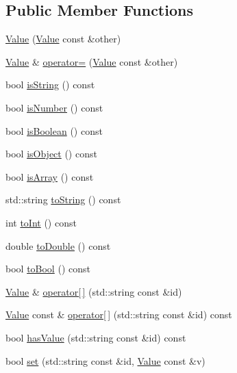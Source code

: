 \subsection*{Public Member Functions}
\begin{DoxyCompactItemize}
\item 
\hyperlink{classj_1_1_value_a9281dfcb57d331813484c0fb2926954e}{Value} (\hyperlink{classj_1_1_value}{Value} const \&other)
\item 
\hyperlink{classj_1_1_value}{Value} \& \hyperlink{classj_1_1_value_ac6f7f01183a7309a5290397f4b981a74}{operator=} (\hyperlink{classj_1_1_value}{Value} const \&other)
\item 
bool \hyperlink{classj_1_1_value_a6afbb65a1bad5ab74846b8ddc4facb1e}{is\-String} () const 
\item 
bool \hyperlink{classj_1_1_value_affbf70f3c3c1b9248c8a779a36b05d7e}{is\-Number} () const 
\item 
bool \hyperlink{classj_1_1_value_abf425e0f735047a53e9c01cb27047f48}{is\-Boolean} () const 
\item 
bool \hyperlink{classj_1_1_value_af9028d620fe389617b2d44ee7f278456}{is\-Object} () const 
\item 
bool \hyperlink{classj_1_1_value_adbbc6726787797844fef035236b90397}{is\-Array} () const 
\item 
std\-::string \hyperlink{classj_1_1_value_aa64c83251f06e39892c2d30ef9420b11}{to\-String} () const 
\item 
int \hyperlink{classj_1_1_value_a25ee203bd5870a7f22ee808dfe511fed}{to\-Int} () const 
\item 
double \hyperlink{classj_1_1_value_a2eaf6897ca4b7d931b248027645b8b0a}{to\-Double} () const 
\item 
bool \hyperlink{classj_1_1_value_abe6657b7f2985d668923d89ce97b825f}{to\-Bool} () const 
\item 
\hyperlink{classj_1_1_value}{Value} \& \hyperlink{classj_1_1_value_a1d7bd6425d8e824c2fb5eba9ae300f35}{operator\mbox{[}$\,$\mbox{]}} (std\-::string const \&id)
\item 
\hyperlink{classj_1_1_value}{Value} const \& \hyperlink{classj_1_1_value_a456ddc23a8788bc3707fd99d8654da1d}{operator\mbox{[}$\,$\mbox{]}} (std\-::string const \&id) const 
\item 
bool \hyperlink{classj_1_1_value_a003ec951adeedf5eae2307c2ef81e6b5}{has\-Value} (std\-::string const \&id) const 
\item 
bool \hyperlink{classj_1_1_value_acb7200e71d27f9271748d478e4b9969b}{set} (std\-::string const \&id, \hyperlink{classj_1_1_value}{Value} const \&v)

\end{DoxyCompactItemize}
